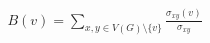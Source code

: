 \documentclass[preview]{standalone}
\begin{document}
\begin{align*}
B(v) = \sum_{x, y \in V(G) \setminus \{v\}} \frac{\sigma_{xy}(v)}{\sigma_{xy}}
\end{align*}
\end{document}
